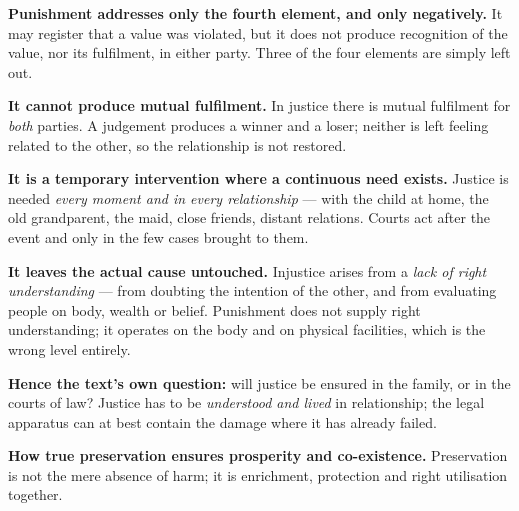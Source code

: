 \begin{apts}
\item \textbf{Punishment addresses only the fourth element, and only
      negatively.} It may register that a value was violated, but it does not
      produce recognition of the value, nor its fulfilment, in either party.
      Three of the four elements are simply left out.
\item \textbf{It cannot produce mutual fulfilment.} In justice there is mutual
      fulfilment for \emph{both} parties. A judgement produces a winner and a
      loser; neither is left feeling related to the other, so the relationship
      is not restored.
\item \textbf{It is a temporary intervention where a continuous need exists.}
      Justice is needed \emph{every moment and in every relationship} --- with
      the child at home, the old grandparent, the maid, close friends, distant
      relations. Courts act after the event and only in the few cases brought
      to them.
\item \textbf{It leaves the actual cause untouched.} Injustice arises from a
      \emph{lack of right understanding} --- from doubting the intention of
      the other, and from evaluating people on body, wealth or belief.
      Punishment does not supply right understanding; it operates on the body
      and on physical facilities, which is the wrong level entirely.
\item \textbf{Hence the text's own question:} will justice be ensured in the
      family, or in the courts of law? Justice has to be \emph{understood and
      lived} in relationship; the legal apparatus can at best contain the
      damage where it has already failed.
\end{apts}

\textbf{How true preservation ensures prosperity and co-existence.}
Preservation is not the mere absence of harm; it is enrichment, protection and
right utilisation together.

